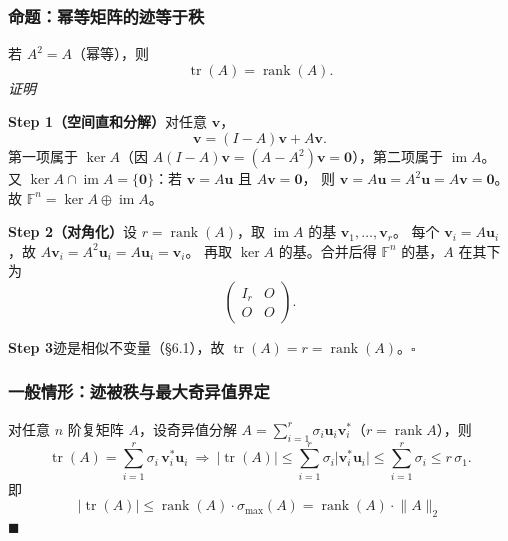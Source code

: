 \documentclass[11pt]{ctexart}
\newcommand{\rank}{\operatorname{rank}}
\newcommand{\tr}{\operatorname{tr}}
\newcommand{\im}{\operatorname{im}}
\newcommand{\F}{\mathbb{F}}
\begin{document}
\subsubsection{命题：幂等矩阵的迹等于秩}
若 $A^2=A$（幂等），则
\[
\tr(A)=\rank(A).
\]
\emph{证明}

\textbf{Step 1（空间直和分解）}\quad 对任意 $\mathbf v$，
\[
\mathbf v=(I-A)\mathbf v+A\mathbf v .
\]
第一项属于 $\ker A$（因 $A(I-A)\mathbf v=(A-A^2)\mathbf v=\mathbf 0$），第二项属于 $\im A$。
又 $\ker A\cap\im A=\{\mathbf 0\}$：若 $\mathbf v=A\mathbf u$ 且 $A\mathbf v=\mathbf 0$，
则 $\mathbf v=A\mathbf u=A^2\mathbf u=A\mathbf v=\mathbf 0$。
故 $\F^n=\ker A\oplus\im A$。

\textbf{Step 2（对角化）}\quad 设 $r=\rank(A)$，取 $\im A$ 的基 $\mathbf v_1,\dots,\mathbf v_r$。
每个 $\mathbf v_i=A\mathbf u_i$，故 $A\mathbf v_i=A^2\mathbf u_i=A\mathbf u_i=\mathbf v_i$。
再取 $\ker A$ 的基。合并后得 $\F^n$ 的基，$A$ 在其下为
\[
\begin{pmatrix}I_r&O\\O&O\end{pmatrix}.
\]

\textbf{Step 3}\quad 迹是相似不变量（\S6.1），故 $\tr(A)=r=\rank(A)$。\hfill$\square$

\subsubsection{一般情形：迹被秩与最大奇异值界定}
对任意 $n$ 阶复矩阵 $A$，设奇异值分解 $A=\sum_{i=1}^{r}\sigma_i\mathbf u_i\mathbf v_i^{*}$（$r=\rank A$），则
\[
\tr(A)=\sum_{i=1}^{r}\sigma_i\,\mathbf v_i^{*}\mathbf u_i
\ \Longrightarrow\
\lvert\tr(A)\rvert\le\sum_{i=1}^r\sigma_i\lvert\mathbf v_i^{*}\mathbf u_i\rvert\le\sum_{i=1}^r\sigma_i\le r\,\sigma_1 .
\]
即
\[
\boxed{\ \lvert\tr(A)\rvert\le\rank(A)\cdot\sigma_{\max}(A)=\rank(A)\cdot\lVert A\rVert_2\ }
\]
\hfill$\blacksquare$

\end{document}
